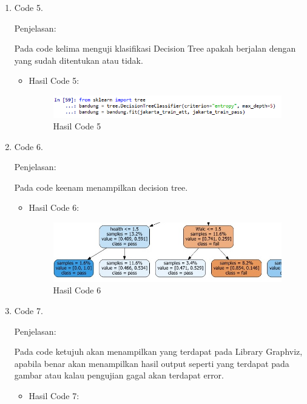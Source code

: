 \begin{itemize}
\begin{enumerate}
\begin{itemize}
\end{itemize}
\par
\item Code 5.
\par Penjelasan:
\par 
Pada code kelima menguji klasifikasi Decision Tree apakah berjalan dengan yang sudah ditentukan atau tidak.
\begin{itemize}
\par
\item Hasil Code 5:

\begin{figure}[ht]
\centering
\includegraphics[scale=0.4]{figures/AnnisaFathoroni-5.png}
\caption{Hasil Code 5}
\label{contoh}
\end{figure}

\end{itemize}
\par
\item Code 6.
\par Penjelasan:
\par 
Pada code keenam menampilkan decision tree.
\begin{itemize}
\par
\item Hasil Code 6:

\begin{figure}[ht]
\centering
\includegraphics[scale=0.4]{figures/AnnisaFathoroni-6a.jpeg}
\caption{Hasil Code 6}
\label{contoh}
\end{figure}

\end{itemize}
\par
\item Code 7.
\par Penjelasan:
\par 
Pada code ketujuh akan menampilkan yang terdapat pada Library Graphviz, apabila benar akan menampilkan hasil output seperti yang terdapat pada gambar atau kalau pengujian gagal akan terdapat error.
\begin{itemize}
\par
\item Hasil Code 7:


\end{itemize}
\end{enumerate}
\end{itemize}
